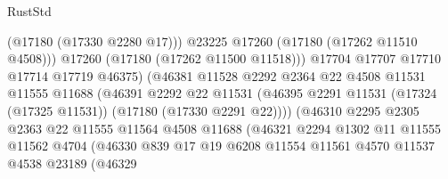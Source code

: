 \begin{lexlean}{RustStd}
\begin{coremodule}
{\begin{coremodule}
{{{{{{{{{{{{{{{{{{{{{{{{{{{{{{{{{{{{{{{{{{{{{{{{{{{{{{{                                        (@17180 (@17330 @2280 @17)))
                                      @23225
                                      @17260
                                      (@17180 (@17262 @11510 @4508)))
                                    @17260
                                    (@17180 (@17262 @11500 @11518)))
                                  @17704
                                  @17707
                                  @17710
                                  @17714
                                  @17719
                                  @46375)
                                (@46381
                                  @11528
                                  @2292
                                  @2364
                                  @22
                                  @4508
                                  @11531
                                  @11555
                                  @11688
                                  (@46391
                                    @2292
                                    @22
                                    @11531
                                    (@46395
                                      @2291
                                      @11531
                                      (@17324 (@17325 @11531))
                                      (@17180 (@17330 @2291 @22))))
                                  (@46310
                                    @2295
                                    @2305
                                    @2363
                                    @22
                                    @11555
                                    @11564
                                    @4508
                                    @11688
                                    (@46321
                                      @2294
                                      @1302
                                      @11
                                      @11555
                                      @11562
                                      @4704
                                      (@46330
                                        @839
                                        @17
                                        @19
                                        @6208
                                        @11554
                                        @11561
                                        @4570
                                        @11537
                                        @4538
                                        @23189
                                        (@46329
}}}}}}}}}}}}}}}}}}}}}}}}}}}}}}}}}}}}}}}}}}}}}}}}}}}}}}}
\end{coremodule}}
\end{coremodule}
\end{lexlean}
